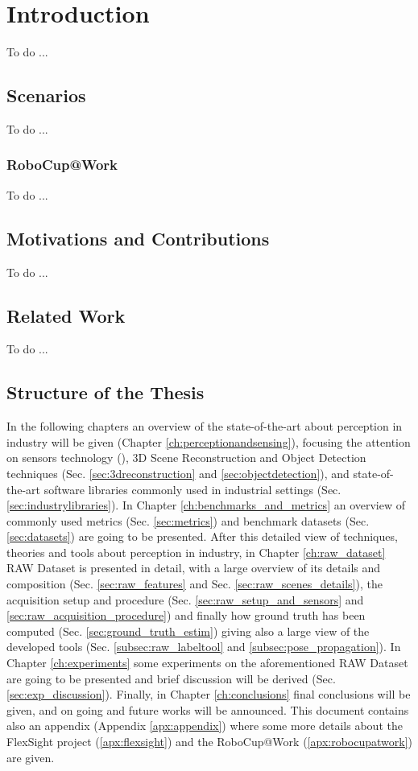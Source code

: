 \chapter{Introduction}\label{ch:intro}
To do ...

\section{Scenarios}\label{sec:scenarios}
To do ...

\subsection{RoboCup@Work}\label{subsec:robocupatwork}
To do ...

\section{Motivations and Contributions}\label{sec:motivations}
To do ...

\section{Related Work}\label{sec:relatedwork}
To do ...

\section{Structure of the Thesis}\label{sec:thesisstructure}
In the following chapters an overview of the state-of-the-art about perception in industry will be given (Chapter \ref{ch:perceptionandsensing}), focusing the attention on sensors technology (), 3D Scene Reconstruction and Object Detection techniques (Sec. \ref{sec:3dreconstruction} and \ref{sec:objectdetection}), and state-of-the-art software libraries commonly used in industrial settings (Sec. \ref{sec:industrylibraries}). In Chapter \ref{ch:benchmarks_and_metrics} an overview of commonly used metrics (Sec. \ref{sec:metrics}) and benchmark datasets (Sec. \ref{sec:datasets}) are going to be presented. After this detailed view of techniques, theories and tools about perception in industry, in Chapter \ref{ch:raw_dataset} RAW Dataset is presented in detail, with a large overview of its details and composition (Sec. \ref{sec:raw_features} and Sec. \ref{sec:raw_scenes_details}), the acquisition setup and procedure (Sec. \ref{sec:raw_setup_and_sensors} and \ref{sec:raw_acquisition_procedure}) and finally how ground truth has been computed (Sec. \ref{sec:ground_truth_estim}) giving also a large view of the developed tools (Sec. \ref{subsec:raw_labeltool} and \ref{subsec:pose_propagation}). In Chapter \ref{ch:experiments} some experiments on the aforementioned RAW Dataset are going to be presented and brief discussion will be derived (Sec. \ref{sec:exp_discussion}). Finally, in Chapter \ref{ch:conclusions} final conclusions will be given, and on going and future works will be announced. This document contains also an appendix (Appendix \ref{apx:appendix}) where some more details about the FlexSight project (\ref{apx:flexsight}) and the RoboCup@Work (\ref{apx:robocupatwork}) are given.